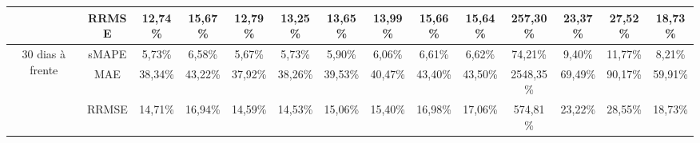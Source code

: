 \begin{landscape}
\begin{table}[!htpb]
\begin{tabular}{@{}cccccccccccccc@{}}
		& RRMSE    & 12,74\%         & 15,67\% & 12,79\%         & 13,25\%         & 13,65\%         & 13,99\%         & 15,66\% & 15,64\% & 257,30\%  & 23,37\% & 27,52\% & 18,73\% \\ \midrule
		\multirow{3}{*}{30 dias à frente} & sMAPE    & 5,73\%          & 6,58\%  & 5,67\%          & 5,73\%          & 5,90\%          & 6,06\%          & 6,61\%  & 6,62\%  & 74,21\%   & 9,40\%  & 11,77\% & 8,21\%  \\
		& MAE      & 38,34\%         & 43,22\% & 37,92\%         & 38,26\%         & 39,53\%         & 40,47\%         & 43,40\% & 43,50\% & 2548,35\% & 69,49\% & 90,17\% & 59,91\% \\ \midrule
		& RRMSE    & 14,71\%         & 16,94\% & 14,59\%         & 14,53\%         & 15,06\%         & 15,40\%         & 16,98\% & 17,06\% & 574,81\%  & 23,22\% & 28,55\% & 18,73\% \\ \cmidrule(l){1-14} 
	\end{tabular}
		
\end{table}

\newpage


\end{landscape}
